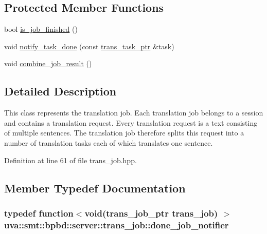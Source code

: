 \subsection*{Protected Member Functions}
\begin{DoxyCompactItemize}
\item 
bool \hyperlink{classuva_1_1smt_1_1bpbd_1_1server_1_1trans__job_ab0a7e64e9f33aa054e84973ffbb41e7c}{is\+\_\+job\+\_\+finished} ()
\item 
void \hyperlink{classuva_1_1smt_1_1bpbd_1_1server_1_1trans__job_ae1ca94b2972dc12e4bc0d8ae6604eae6}{notify\+\_\+task\+\_\+done} (const \hyperlink{namespaceuva_1_1smt_1_1bpbd_1_1server_a4dea4bb1185fe5d148be18ad12fea74a}{trans\+\_\+task\+\_\+ptr} \&task)
\item 
void \hyperlink{classuva_1_1smt_1_1bpbd_1_1server_1_1trans__job_aab4acf457f64a84e517a25d848959d8a}{combine\+\_\+job\+\_\+result} ()
\end{DoxyCompactItemize}


\subsection{Detailed Description}
This class represents the translation job. Each translation job belongs to a session and contains a translation request. Every translation request is a text consisting of multiple sentences. The translation job therefore splits this request into a number of translation tasks each of which translates one sentence. 

Definition at line 61 of file trans\+\_\+job.\+hpp.



\subsection{Member Typedef Documentation}
\hypertarget{classuva_1_1smt_1_1bpbd_1_1server_1_1trans__job_ad136e2791c7f5259a4e0974db72e7178}{}
\subsubsection[{done\+\_\+job\+\_\+notifier}]{\setlength{\rightskip}{0pt plus 5cm}typedef function$<$void({\bf trans\+\_\+job\+\_\+ptr} {\bf trans\+\_\+job}) $>$ {\bf uva\+::smt\+::bpbd\+::server\+::trans\+\_\+job\+::done\+\_\+job\+\_\+notifier}}\label{classuva_1_1smt_1_1bpbd_1_1server_1_1trans__job_ad136e2791c7f5259a4e0974db72e7178}


